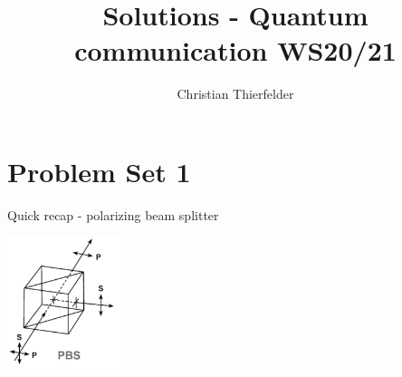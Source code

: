 \documentclass{article}
\title{Solutions - Quantum communication WS20/21}
\author{Christian Thierfelder}
\begin{document}
\maketitle


\section*{Problem Set 1}
    Quick recap - polarizing beam splitter
    \begin{center}
        \includegraphics[width=0.25\textwidth]{PBS.png}
    \end{center}
    
\end{document}
